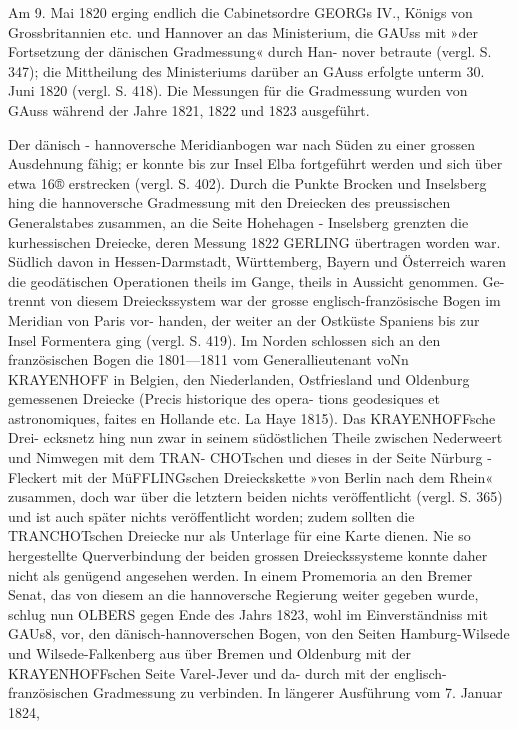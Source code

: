 \documentclass[12pt,a4paper]{article}
\theoremstyle{plain}
\theoremstyle{definition}
\theoremstyle{remark}
\begin{document}
\noindent
Am 9. Mai 1820 erging endlich die Cabinetsordre GEORGs IV., Königs von Grossbritannien etc. und
Hannover an das Ministerium, die GAUss mit »der Fortsetzung der dänischen Gradmessung« durch Han-
nover betraute (vergl. S. 347); die Mittheilung des Ministeriums darüber an GAuss erfolgte unterm 30. Juni
1820 (vergl. S. 418). Die Messungen für die Gradmessung wurden von GAuss während der Jahre 1821, 1822
und 1823 ausgeführt.

\noindent
Der dänisch - hannoversche Meridianbogen war nach Süden zu einer grossen Ausdehnung fähig; er
konnte bis zur Insel Elba fortgeführt werden und sich über etwa 16® erstrecken (vergl. S. 402). Durch die
Punkte Brocken und Inselsberg hing die hannoversche Gradmessung mit den Dreiecken des preussischen
Generalstabes zusammen, an die Seite Hohehagen - Inselsberg grenzten die kurhessischen Dreiecke, deren
Messung 1822 GERLING übertragen worden war. Südlich davon in Hessen-Darmstadt, Württemberg, Bayern
und Österreich waren die geodätischen Operationen theils im Gange, theils in Aussicht genommen. Ge-
trennt von diesem Dreieckssystem war der grosse englisch-französische Bogen im Meridian von Paris vor-
handen, der weiter an der Ostküste Spaniens bis zur Insel Formentera ging (vergl. S. 419). Im Norden
schlossen sich an den französischen Bogen die 1801---1811 vom Generallieutenant voNn KRAYENHOFF in
Belgien, den Niederlanden, Ostfriesland und Oldenburg gemessenen Dreiecke (Precis historique des opera-
tions geodesiques et astronomiques, faites en Hollande etc. La Haye 1815). Das KRAYENHOFFsche Drei-
ecksnetz hing nun zwar in seinem südöstlichen Theile zwischen Nederweert und Nimwegen mit dem TRAN-
CHOTschen und dieses in der Seite Nürburg - Fleckert mit der MüFFLINGschen Dreieckskette »von Berlin
nach dem Rhein« zusammen, doch war über die letztern beiden nichts veröffentlicht (vergl. S. 365) und ist
auch später nichts veröffentlicht worden; zudem sollten die TRANCHOTschen Dreiecke nur als Unterlage für
eine Karte dienen. Nie so hergestellte Querverbindung der beiden grossen Dreieckssysteme konnte daher
nicht als genügend angesehen werden. In einem Promemoria an den Bremer Senat, das von diesem an die
hannoversche Regierung weiter gegeben wurde, schlug nun OLBERS gegen Ende des Jahrs 1823, wohl im
Einverständniss mit GAUs8, vor, den dänisch-hannoverschen Bogen, von den Seiten Hamburg-Wilsede und
Wilsede-Falkenberg aus über Bremen und Oldenburg mit der KRAYENHOFFschen Seite Varel-Jever und da-
durch mit der englisch-französischen Gradmessung zu verbinden. In längerer Ausführung vom 7. Januar 1824,
\end{document}
